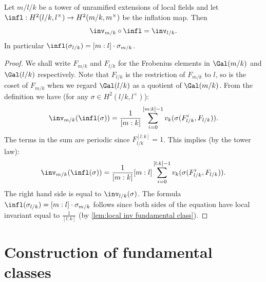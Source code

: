 \begin{lemma} \label{lem:local unram inv infl}
	Let $m / l / k$ be a tower of unramified extensions of local fields
	and let $\infl : H^2(l/k,l^\times) \to H^2(m/k,m^\times)$ be the inflation map.
	Then
	\[
		\inv_{m/k} \circ \infl  = \inv_{l/k}.
	\]
	In particular $\infl(\sigma_{l/k}) = [m:l]\cdot \sigma_{m/k}$.
\end{lemma}

\begin{proof}
	We shall write $F_{m/k}$ and $F_{l/k}$ for the Frobenius elements in $\Gal(m/k)$ and
	$\Gal(l/k)$ respectively. Note that $F_{l/k}$ is the restriction of $F_{m/k}$ to $l$,
	so is the coset of $F_{m/k}$ when we regard $\Gal(l/k)$ as a quotient of $\Gal(m/k)$.
	From the definition we have (for any $\sigma \in H^2(l/k,l^\times)$):
	\[
		\inv_{m/k}(\infl(\sigma))
		= \frac{1}{[m:k]}\sum_{i=0}^{[m:k]-1} v_k(\sigma(F_{l/k}^i,F_{l/k})).
	\]
	The terms in the sum are periodic since $F_{l/k}^{[l:k]}=1$.
	This implies (by the tower law):
	\[
		\inv_{m/k}(\infl(\sigma))
		= \frac{1}{[m:k]} [m:l]\sum_{i=0}^{[l:k]-1} v_k(\sigma(F_{l/k}^i,F_{l/k})).
	\]
	The right hand side is equal to $\inv_{l/k}(\sigma)$.
	The formula $\infl(\sigma_{l/k}) = [m:l]\cdot \sigma_{m/k}$ follows since both sides of the
	equation have local invariant equal to $\frac{1}{[l:k]}$
	(by \ref{lem:local inv fundamental class}).
\end{proof}






\section{Construction of fundamental classes}

